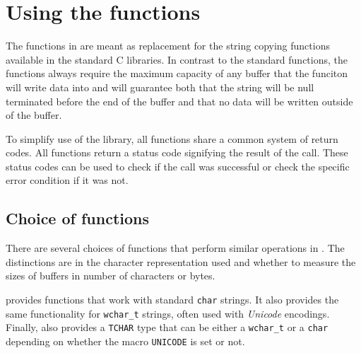\section{Using the \strsafe{} functions}
The functions in \strsafe{} are meant as replacement for
the string copying functions available in the standard C libraries.
In contrast to the standard functions,
the functions always require the maximum capacity of any buffer
that the funciton will write data into
and will guarantee both
that the string will be null terminated before the end of the buffer
and that no data will be written outside of the buffer.

To simplify use of the library,
all functions share a common system of return codes.
All functions return a status code signifying the result of the call.
These status codes can be used to check if the call was successful
or check the specific error condition if it was not.

\subsection{Choice of functions}
There are several choices of functions
that perform similar operations in \strsafe{}.
The distinctions are in the character representation used
and whether to measure the sizes of buffers
in number of characters or bytes.

\strsafe{} provides functions that work with standard \texttt{char} strings.
It also provides the same functionality for \texttt{wchar\_t} strings,
often used with \emph{Unicode} encodings.
Finally, \strsafe{} also provides a \texttt{TCHAR} type that can be either a
\texttt{wchar\_t} or a \texttt{char} depending on
whether the macro \texttt{UNICODE} is set or not.
